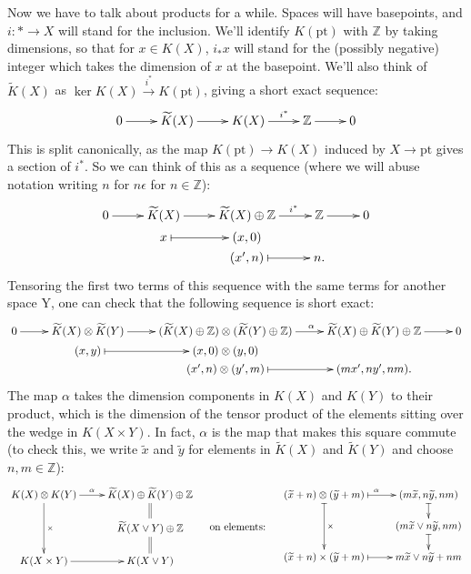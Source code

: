 \documentclass{article}
\newcommand{\Z}{\mathbb{Z}}
\newcommand{\ptspace}{\mathrm{pt}}
\begin{document}
Now we have to talk about products for a while.  Spaces will have basepoints, and $i:*\to X$ will stand for the inclusion. We'll identify $K(\ptspace)$ with $\Z$ by taking dimensions, so that for $x\in K(X)$, $i_*x$ will stand for the (possibly negative) integer which takes the dimension of $x$ at the basepoint.  We'll also think of $\widetilde K(X)$ as $\ker K(X) \stackrel{i^*}{\to} K(\ptspace)$, giving a short exact sequence:
\[\xymatrix{
0\ar[r]&\widetilde K(X)\ar[r]& K(X)\ar[r]^{\ \ \ i^*}&\Z\ar[r]&0
}\]
This is split canonically, as the map $K(\ptspace) \to K(X)$ induced by $X \to \ptspace$ gives a section of $i^*$. So we can think of this as a sequence (where we will abuse notation writing $n$ for $n\epsilon$ for $n\in\Z$):
\[\xymatrix@R=0mm{
0\ar[r]&\widetilde K(X)\ar[r]& \widetilde K(X)\oplus\Z\ar[r]^{\ \ \ \ \ i^*}&\Z\ar[r]&0\\
&x\ar@{|->}[r]&(x,0)\\
&&(x',n)\ar@{|->}[r]&n.
}\]
Tensoring the first two terms of this sequence with the same terms for another space Y, one can check that the following sequence is short exact:%
\[\xymatrix@R=0mm{
0\ar[r]&\widetilde K(X) \otimes \widetilde K(Y)\ar[r]& (\widetilde K(X) \oplus \Z) \otimes (\widetilde K(Y) \oplus \Z)\ar[r]^{\qquad\alpha}&\widetilde K(X) \oplus \widetilde K(Y) \oplus \Z\ar[r]&0\\
&(x,y)\ar@{|->}[r]&(x,0)\otimes(y,0)\\
&&(x',n)\otimes(y',m)\ar@{|->}[r]&(mx',ny',nm).
}\]
The map $\alpha$ takes the dimension components in $K(X)$ and $K(Y)$ to their product, which is the dimension of the tensor product of the elements sitting over the wedge in $K(X \times Y)$.  In fact, $\alpha$ is the map that makes this square commute (to check this, we write $\widetilde x$ and $\widetilde y$ for elements in $\widetilde K(X)$ and $\widetilde K(Y)$ and choose $n,m\in\Z$):
\[\xymatrix@R=5mm{
K(X) \otimes K(Y)\ar[r]^{\alpha\ \ \ }\ar[dd]^\times&\widetilde K(X) \oplus \widetilde K(Y) \oplus \Z\\
&\widetilde K(X\vee Y)\oplus \Z\ar@{=}[d]\ar@{=}[u]\\
K(X\times Y)\ar[r]&K(X\vee Y)
}\ \ \ \raisebox{-1.1cm}{\text{ on elements: }}\ \ \ 
\xymatrix@R=5mm{
(\widetilde x+n) \otimes (\widetilde y+m)\ar@{|->}[r]^{\alpha\hspace{0cm}}\ar@{|->}[dd]^\times&
(m\widetilde x,n\widetilde y,nm)\ar@{|->}[d]\\
&(m\widetilde x\vee n\widetilde y,nm)\ar@{|->}[d]\\
(\widetilde x+n) \times (\widetilde y+m)\ar@{|->}[r]&m\widetilde x\vee n\widetilde y+nm
}\]
\end{document}
